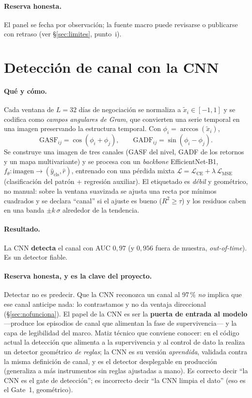 \documentclass[11pt,a4paper]{article}
\begin{document}
\paragraph{Reserva honesta.} El panel se fecha por observación; la fuente macro
puede revisarse o publicarse con retraso (ver §\ref{sec:limites}, punto~i).

\section{Detección de canal con la CNN}
\paragraph{Qué y cómo.} Cada ventana de $L=32$ días de negociación se normaliza a
$\tilde{x}_i\in[-1,1]$ y se codifica como \emph{campos angulares de Gram}, que
convierten una serie temporal en una imagen preservando la estructura temporal.
Con $\phi_i=\arccos(\tilde{x}_i)$,
\begin{equation}
\mathrm{GASF}_{ij}=\cos(\phi_i+\phi_j),\qquad
\mathrm{GADF}_{ij}=\sin(\phi_i-\phi_j).
\end{equation}
Se construye una imagen de tres canales (GASF del nivel, GADF de los retornos y
un mapa multivariante) y se procesa con un \emph{backbone} EfficientNet-B1,
$f_\theta:\text{imagen}\to(\hat{y}_{\text{cls}},\hat{r})$, entrenado con una
pérdida mixta $\mathcal{L}=\mathcal{L}_{\text{CE}}+\lambda\,\mathcal{L}_{\text{MSE}}$
(clasificación del patrón + regresión auxiliar). El etiquetado es \emph{débil} y
geométrico, no manual: sobre la ventana suavizada se ajusta una recta por mínimos
cuadrados y se declara ``canal'' si el ajuste es bueno ($R^2\ge\tau$) y los
residuos caben en una banda $\pm k\,\sigma$ alrededor de la tendencia.

\paragraph{Resultado.} La CNN \textbf{detecta} el canal con AUC $0{,}97$ (y
$0{,}956$ fuera de muestra, \emph{out-of-time}). Es un detector fiable.

\paragraph{Reserva honesta, y es la clave del proyecto.} Detectar no es predecir.
Que la CNN reconozca un canal al 97\,\% \emph{no} implica que ese canal anticipe
nada: lo contrastamos y no da ventaja direccional (§\ref{sec:nofunciona}). El
papel de la CNN es ser la \textbf{puerta de entrada al modelo} ---produce los
episodios de canal que alimentan la fase de supervivencia--- y la capa de
legibilidad del marco. Matiz técnico que conviene conocer: en el código actual la
detección que alimenta a la supervivencia y al control de dato la realiza un
detector geométrico \emph{de reglas}; la CNN es su versión \emph{aprendida},
validada contra la misma definición de canal, y es el detector desplegable en
producción (generaliza a más instrumentos sin reglas ajustadas a mano). Es
correcto decir ``la CNN es el gate de detección''; es incorrecto decir ``la CNN
limpia el dato'' (eso es el Gate~1, geométrico).
\end{document}
